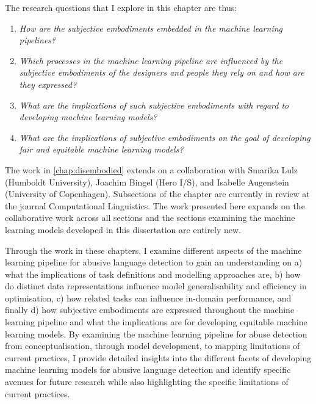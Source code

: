 The research questions that I explore in this chapter are thus:

\begin{center}
\begin{minipage}{0.9\textwidth}
\vspace{5mm}
    \begin{enumerate}[start=10, label={\textbf{RQ \arabic*}}]
        \item{\textit{How are the subjective embodiments embedded in the machine learning pipelines?}}
        \item{\textit{Which processes in the machine learning pipeline are influenced by the subjective embodiments of the designers and people they rely on and how are they expressed?}}
        \item{\textit{What are the implications of such subjective embodiments with regard to developing machine learning models?}}
        \item{\textit{What are the implications of subjective embodiments on the goal of developing fair and equitable machine learning models?}}
    \end{enumerate}
\vspace{5mm}
\end{minipage}
\end{center}

The work in \cref{chap:disembodied} extends on a collaboration with Smarika Lulz (Humboldt University), Joachim Bingel (Hero I/S), and Isabelle Augenstein (University of Copenhagen). Subsections of the chapter are currently in review at the journal Computational Linguistics.
The work presented here expands on the collaborative work across all sections and the sections examining the machine learning models developed in this dissertation are entirely new.

Through the work in these chapters, I examine different aspects of the machine learning pipeline for abusive language detection to gain an understanding on a) what the implications of task definitions and modelling approaches are, b) how do distinct data representations influence model generalisability and efficiency in optimisation, c) how related tasks can influence in-domain performance, and finally d) how subjective embodiments are expressed throughout the machine learning pipeline and what the implications are for developing equitable machine learning models.
By examining the machine learning pipeline for abuse detection from conceptualisation, through model development, to mapping limitations of current practices, I provide detailed insights into the different facets of developing machine learning models for abusive language detection and identify specific avenues for future research while also highlighting the specific limitations of current practices.

